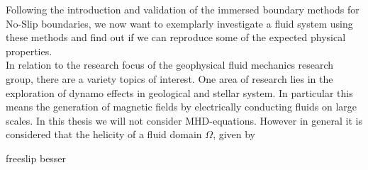 Following the introduction and validation of the immersed boundary methods for No-Slip boundaries,
we now want to exemplarly investigate a fluid system using these methods
and find out if we can reproduce some of the expected physical properties.\\
In relation to the research focus of the geophysical fluid mechanics research group, there are a variety
topics of interest.
One area of research lies in the exploration of dynamo effects in geological and stellar system.
In particular this means the generation of magnetic fields by electrically conducting fluids on large scales.
In this thesis we will not consider MHD-equations.
However in general it is considered that the helicity of a fluid domain $\Omega$, given by

freeslip besser




